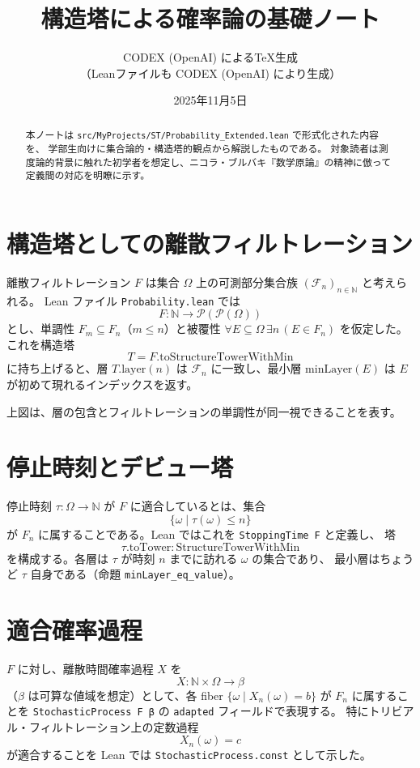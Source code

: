 \documentclass[12pt]{ltjsarticle}
\title{構造塔による確率論の基礎ノート}
\author{CODEX (OpenAI) によるTeX生成\\[2pt]
（Leanファイルも CODEX (OpenAI) により生成）}
\date{2025年11月5日}
\begin{document}
\maketitle

\begin{abstract}
本ノートは \texttt{src/MyProjects/ST/Probability\_Extended.lean} で形式化された内容を、
学部生向けに集合論的・構造塔的観点から解説したものである。
対象読者は測度論的背景に触れた初学者を想定し、ニコラ・ブルバキ『数学原論』の精神に倣って
定義間の対応を明瞭に示す。
\end{abstract}

\section{構造塔としての離散フィルトレーション}
離散フィルトレーション $F$ は集合 $\Omega$ 上の可測部分集合族 $(\mathcal{F}_n)_{n \in \mathbb{N}}$ と考えられる。
Lean ファイル \texttt{Probability.lean} では
\[
F : \mathbb{N} \to \mathcal{P}(\mathcal{P}(\Omega))
\]
とし、単調性 $F_m \subseteq F_n$（$m \le n$）と被覆性 $\forall E \subseteq \Omega\, \exists n \, (E \in F_n)$ を仮定した。
これを構造塔
\[
T = F.\mathrm{toStructureTowerWithMin}
\]
に持ち上げると、層 $T.\mathrm{layer}(n)$ は $\mathcal{F}_n$ に一致し、最小層 $\mathrm{minLayer}(E)$ は
$E$ が初めて現れるインデックスを返す。


上図は、層の包含とフィルトレーションの単調性が同一視できることを表す。

\section{停止時刻とデビュー塔}
停止時刻 $\tau : \Omega \to \mathbb{N}$ が $F$ に適合しているとは、集合
\[
\{\omega \mid \tau(\omega) \le n\}
\]
が $F_n$ に属することである。Lean ではこれを \texttt{StoppingTime F} と定義し、
塔
\[
\tau.\mathrm{toTower} : \mathrm{StructureTowerWithMin}
\]
を構成する。各層は $\tau$ が時刻 $n$ までに訪れる $\omega$ の集合であり、
最小層はちょうど $\tau$ 自身である（命題 \texttt{minLayer\_eq\_value}）。

\section{適合確率過程}
$F$ に対し、離散時間確率過程 $X$ を
\[
X : \mathbb{N} \times \Omega \to \beta
\]
（$\beta$ は可算な値域を想定）として、各 fiber
$\{\omega \mid X_n(\omega) = b\}$ が $F_n$ に属することを
\texttt{StochasticProcess F β} の \texttt{adapted} フィールドで表現する。
特にトリビアル・フィルトレーション上の定数過程
\[
X_n(\omega) = c
\]
が適合することを Lean では \texttt{StochasticProcess.const} として示した。
\end{document}

